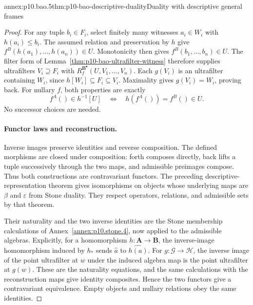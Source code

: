 \begin{annexitem}{annex:p10.bao.5}{thm:p10-bao-descriptive-duality}{Duality with descriptive general frames}
\begin{proof}
For any tuple \(b_i\in F_i\), select finitely many witnesses
\(a_i\in W_i\) with \(h(a_i)\leq b_i\).
The assumed relation and preservation by \(h\) give
\(f^B(h(a_1),\ldots,h(a_n))\in U\).
Monotonicity then gives \(f^B(b_1,\ldots,b_n)\in U\).
The filter form of
Lemma~\ref{thm:p10-bao-ultrafilter-witness} therefore supplies
ultrafilters \(V_i\supseteq F_i\) with
\(R_f^{\mathbf B^\bullet}(U,V_1,\ldots,V_n)\).
Each \(g(V_i)\) is an ultrafilter containing \(W_i\), since
\(h[W_i]\subseteq F_i\subseteq V_i\).
Maximality gives \(g(V_i)=W_i\), proving back.
For nullary \(f\), both properties are exactly
\[
 f^A()\in h^{-1}[U]
       \quad\Longleftrightarrow\quad
 h(f^A())=f^B()\in U.
\]
No successor choices are needed.

\paragraph{Functor laws and reconstruction.}
Inverse images preserve identities and reverse composition.
The defined morphisms are closed under composition: forth composes
directly, back lifts a tuple successively through the two maps,
and admissible preimages compose.
Thus both constructions are contravariant functors.
The preceding descriptive-representation theorem gives
isomorphisms on objects whose underlying maps are \(\beta\)
and \(\varepsilon\) from Stone duality.
They respect operators, relations, and admissible sets by that theorem.

Their naturality and the two inverse identities are the Stone
membership calculations of Annex~\ref{annex:p10.stone.4},
now applied to the admissible algebras.
Explicitly, for a homomorphism \(h:\mathbf A\to\mathbf B\),
the inverse-image homomorphism induced by \(h_*\) sends
\(\widehat a\) to \(\widehat{h(a)}\).
For \(g:\mathcal G\to\mathcal H\), the inverse image of the
point ultrafilter at \(w\) under the induced algebra map is
the point ultrafilter at \(g(w)\).
These are the naturality equations, and the same calculations
with the reconstruction maps give identity composites.
Hence the two functors give a contravariant equivalence.
Empty objects and nullary relations obey the same identities.
\end{proof}
\end{annexitem}
